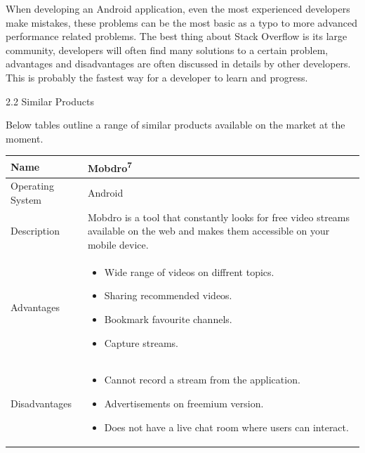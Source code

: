 \documentclass{article}
\begin{document}
\begin{flushleft}
When developing an Android application, even the most experienced developers make mistakes, these problems can be the most basic as a typo to more advanced performance related problems. The best thing about Stack Overflow is its large community, developers will often find many solutions to a certain problem, advantages and disadvantages are often discussed in details by other developers. This is probably the fastest way for a developer to learn and progress.\par
{\Large 2.2 Similar Products}\par
Below tables outline a range of similar products available on the market at the moment.
\begin{longtable}{| p{2.2cm} | p{9cm} |}
\hline
Name & Mobdro\textsuperscript{7}\\
\hline
Operating System & Android\\
\hline
Description & Mobdro is a tool that constantly looks for free video streams available on the web and makes them accessible on your mobile device.\\
\hline
Advantages & 
\begin{itemize} 
	\item Wide range of videos on diffrent topics.
	\item Sharing recommended videos.
	\item Bookmark favourite channels.
	\item Capture streams.
\end{itemize}\\
\hline
Disadvantages &
\begin{itemize}
	\item Cannot record a stream from the application.
	\item Advertisements on freemium version.
	\item Does not have a live chat room where users can interact.
\end{itemize}\\
\hline
\end{longtable}


\end{flushleft}
\end{document}
